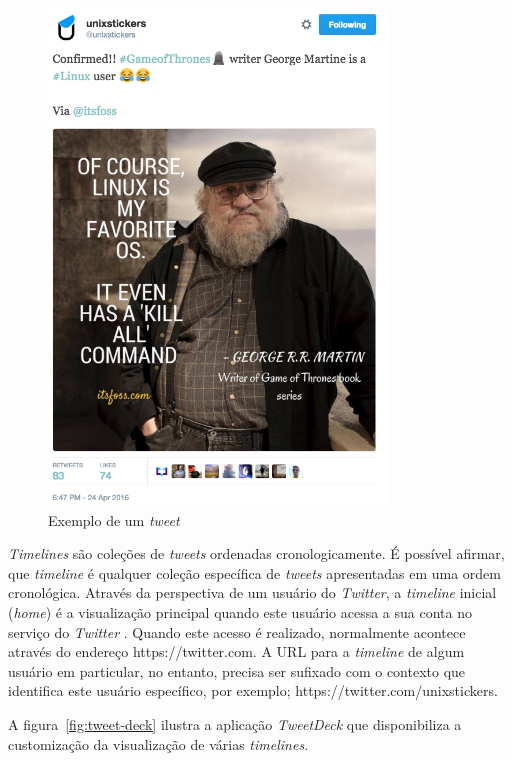 \begin{figure}[h]
  \centering
  \includegraphics[width=0.8\textwidth]{Cap4/imagens/tweet}
  \caption{Exemplo de um \textit{tweet}}
  \vspace{-0.3cm}
  \label{fig:tweet}
\end{figure}


\textit{Timelines} são coleções de \textit{tweets} ordenadas cronologicamente. É possível afirmar, que \textit{timeline} é qualquer coleção específica de \textit{tweets} apresentadas em uma ordem cronológica. Através da perspectiva de um usuário do \textit{Twitter}, a \textit{timeline} inicial (\textit{home}) é a visualização principal quando este usuário acessa a sua conta no serviço do \textit{Twitter} \cite{mining-social-web}. Quando este acesso é realizado, normalmente acontece através do endereço https://twitter.com. A URL para a \textit{timeline} de algum usuário em particular, no entanto, precisa ser sufixado com o contexto que identifica este usuário específico, por exemplo; https://twitter.com/unixstickers.

A figura~\ref{fig:tweet-deck} ilustra a aplicação \textit{TweetDeck} que disponibiliza a customização da visualização de várias \textit{timelines}.

